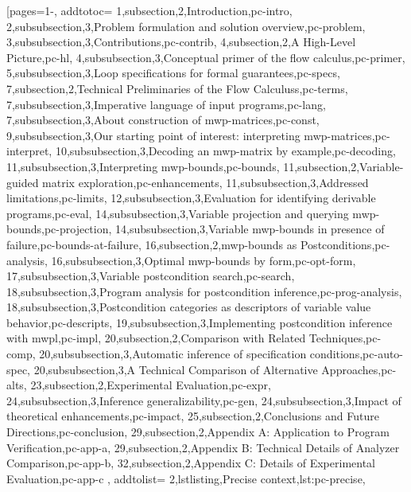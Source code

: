 [pages={1-},
    addtotoc={
        1,subsection,2,{Introduction},pc-intro,
        2,subsubsection,3,{Problem formulation and solution overview},pc-problem,
        3,subsubsection,3,{Contributions},pc-contrib,
        4,subsection,2,{A High-Level Picture},pc-hl,
        4,subsubsection,3,{Conceptual primer of the flow calculus},pc-primer,
        5,subsubsection,3,{Loop specifications for formal guarantees},pc-specs,
        7,subsection,2,{Technical Preliminaries of the Flow Calculuss},pc-terms,
        7,subsubsection,3,{Imperative language of input programs},pc-lang,
        7,subsubsection,3,{About construction of mwp-matrices},pc-const,
        9,subsubsection,3,{Our starting point of interest: interpreting mwp-matrices},pc-interpret,
        10,subsubsection,3,{Decoding an mwp-matrix by example},pc-decoding,
        11,subsubsection,3,{Interpreting mwp-bounds},pc-bounds,
        11,subsection,2,{Variable-guided matrix exploration},pc-enhancements,
        11,subsubsection,3,{Addressed limitations},pc-limits,
        12,subsubsection,3,{Evaluation for identifying derivable programs},pc-eval,
        14,subsubsection,3,{Variable projection and querying mwp-bounds},pc-projection,
        14,subsubsection,3,{Variable mwp-bounds in presence of failure},pc-bounds-at-failure,
        16,subsection,2,{mwp-bounds as Postconditions},pc-analysis,
        16,subsubsection,3,{Optimal mwp-bounds by form},pc-opt-form,
        17,subsubsection,3,{Variable postcondition search},pc-search,
        18,subsubsection,3,{Program analysis for postcondition inference},pc-prog-analysis,
        18,subsubsection,3,{Postcondition categories as descriptors of variable value behavior},pc-descripts,
        19,subsubsection,3,{Implementing postcondition inference with mwpl},pc-impl,
        20,subsection,2,{Comparison with Related Techniques},pc-comp,
        20,subsubsection,3,{Automatic inference of specification conditions},pc-auto-spec,
        20,subsubsection,3,{A Technical Comparison of Alternative Approaches},pc-alts,
        23,subsection,2,{Experimental Evaluation},pc-expr,
        24,subsubsection,3,{Inference generalizability},pc-gen,
        24,subsubsection,3,{Impact of theoretical enhancements},pc-impact,
        25,subsection,2,{Conclusions and Future Directions},pc-conclusion,
        29,subsection,2,{Appendix A: Application to Program Verification},pc-app-a,
        29,subsection,2,{Appendix B: Technical Details of Analyzer Comparison},pc-app-b,
        32,subsection,2,{Appendix C: Details of Experimental Evaluation},pc-app-c
    }, addtolist={
        2,lstlisting,{Precise context},lst:pc-precise,
}
